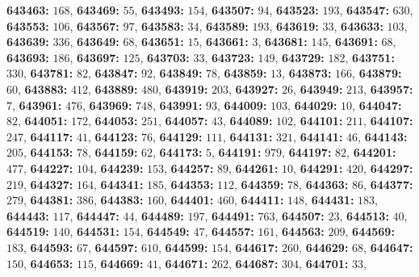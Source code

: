 \textsf{\bfseries 643463:} $168$, \textsf{\bfseries 643469:} $55$, \textsf{\bfseries 643493:} $154$, \textsf{\bfseries 643507:} $94$, \textsf{\bfseries 643523:} $193$, \textsf{\bfseries 643547:} $630$, \textsf{\bfseries 643553:} $106$, \textsf{\bfseries 643567:} $97$, \textsf{\bfseries 643583:} $34$, \textsf{\bfseries 643589:} $193$, \textsf{\bfseries 643619:} $33$, \textsf{\bfseries 643633:} $103$, \textsf{\bfseries 643639:} $336$, \textsf{\bfseries 643649:} $68$, \textsf{\bfseries 643651:} $15$, \textsf{\bfseries 643661:} $3$, \textsf{\bfseries 643681:} $145$, \textsf{\bfseries 643691:} $68$, \textsf{\bfseries 643693:} $186$, \textsf{\bfseries 643697:} $125$, \textsf{\bfseries 643703:} $33$, \textsf{\bfseries 643723:} $149$, \textsf{\bfseries 643729:} $182$, \textsf{\bfseries 643751:} $330$, \textsf{\bfseries 643781:} $82$, \textsf{\bfseries 643847:} $92$, \textsf{\bfseries 643849:} $78$, \textsf{\bfseries 643859:} $13$, \textsf{\bfseries 643873:} $166$, \textsf{\bfseries 643879:} $60$, \textsf{\bfseries 643883:} $412$, \textsf{\bfseries 643889:} $480$, \textsf{\bfseries 643919:} $203$, \textsf{\bfseries 643927:} $26$, \textsf{\bfseries 643949:} $213$, \textsf{\bfseries 643957:} $7$, \textsf{\bfseries 643961:} $476$, \textsf{\bfseries 643969:} $748$, \textsf{\bfseries 643991:} $93$, \textsf{\bfseries 644009:} $103$, \textsf{\bfseries 644029:} $10$, \textsf{\bfseries 644047:} $82$, \textsf{\bfseries 644051:} $172$, \textsf{\bfseries 644053:} $251$, \textsf{\bfseries 644057:} $43$, \textsf{\bfseries 644089:} $102$, \textsf{\bfseries 644101:} $211$, \textsf{\bfseries 644107:} $247$, \textsf{\bfseries 644117:} $41$, \textsf{\bfseries 644123:} $76$, \textsf{\bfseries 644129:} $111$, \textsf{\bfseries 644131:} $321$, \textsf{\bfseries 644141:} $46$, \textsf{\bfseries 644143:} $205$, \textsf{\bfseries 644153:} $78$, \textsf{\bfseries 644159:} $62$, \textsf{\bfseries 644173:} $5$, \textsf{\bfseries 644191:} $979$, \textsf{\bfseries 644197:} $82$, \textsf{\bfseries 644201:} $477$, \textsf{\bfseries 644227:} $104$, \textsf{\bfseries 644239:} $153$, \textsf{\bfseries 644257:} $89$, \textsf{\bfseries 644261:} $10$, \textsf{\bfseries 644291:} $420$, \textsf{\bfseries 644297:} $219$, \textsf{\bfseries 644327:} $164$, \textsf{\bfseries 644341:} $185$, \textsf{\bfseries 644353:} $112$, \textsf{\bfseries 644359:} $78$, \textsf{\bfseries 644363:} $86$, \textsf{\bfseries 644377:} $279$, \textsf{\bfseries 644381:} $386$, \textsf{\bfseries 644383:} $160$, \textsf{\bfseries 644401:} $460$, \textsf{\bfseries 644411:} $148$, \textsf{\bfseries 644431:} $183$, \textsf{\bfseries 644443:} $117$, \textsf{\bfseries 644447:} $44$, \textsf{\bfseries 644489:} $197$, \textsf{\bfseries 644491:} $763$, \textsf{\bfseries 644507:} $23$, \textsf{\bfseries 644513:} $40$, \textsf{\bfseries 644519:} $140$, \textsf{\bfseries 644531:} $154$, \textsf{\bfseries 644549:} $47$, \textsf{\bfseries 644557:} $161$, \textsf{\bfseries 644563:} $209$, \textsf{\bfseries 644569:} $183$, \textsf{\bfseries 644593:} $67$, \textsf{\bfseries 644597:} $610$, \textsf{\bfseries 644599:} $154$, \textsf{\bfseries 644617:} $260$, \textsf{\bfseries 644629:} $68$, \textsf{\bfseries 644647:} $150$, \textsf{\bfseries 644653:} $115$, \textsf{\bfseries 644669:} $41$, \textsf{\bfseries 644671:} $262$, \textsf{\bfseries 644687:} $304$, \textsf{\bfseries 644701:} $33$, 
